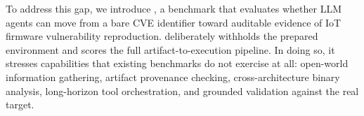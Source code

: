 To address this gap, we introduce \sys, a benchmark that evaluates whether LLM agents can move from a bare CVE identifier toward auditable evidence of IoT firmware vulnerability reproduction.
%
\sys{} deliberately withholds the prepared environment and scores the full artifact-to-execution pipeline. 
%
In doing so, it stresses capabilities that existing benchmarks do not exercise at all: open-world information gathering, artifact provenance checking, cross-architecture binary analysis, long-horizon tool orchestration, and grounded validation against the real target.



